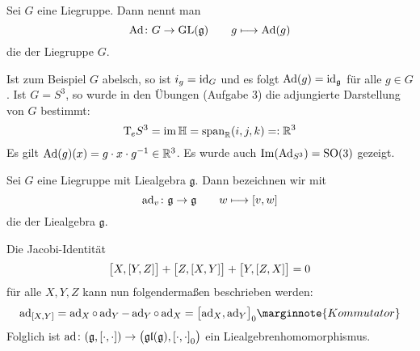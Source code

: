 \begin{definition}[{name=[adjungierte Darstellung der Liegruppe]}]
	Sei $G$ eine Liegruppe.
	Dann nennt man 
	\[
		\Ad \colon G \to \GL(\mathfrak{g}) \qquad g \longmapsto \Ad(g)
	\]
	die  der Liegruppe $G$.
\end{definition}

Ist zum Beispiel $G$ abelsch, so ist $i_g = \id_G$ und es folgt ${\Ad(g)} = \id_{\mathfrak{g}}$ für alle $g \in G$.
Ist $G=S^3$, so wurde in den Übungen (Aufgabe 3) die adjungierte Darstellung von $G$ bestimmt:
\[
	\Tmap_e S^3 = \im \mathbb{H} = \Span_\mathbb{R} (i,j,k) =: \mathbb{R}^3
\]
Es gilt $\Ad(g)(x) = g \cdot x \cdot g^{-1} \in \mathbb{R}^3$.
Es wurde auch $\Im \enbrace*{\Ad_{S^3}} = \SO(3)$ gezeigt.

\begin{definition}[{name=[adjungierte Darstellung der Liealgebra]}]
	Sei $G$ eine Liegruppe mit Liealgebra $\mathfrak{g}$.
	Dann bezeichnen wir mit 
	\[
		\ad_v \colon \mathfrak{g} \to \mathfrak{g} \qquad w \longmapsto \benbrace*{v,w}
	\]
	die  der Liealgebra $\mathfrak{g}$.
\end{definition}

Die Jacobi-Identität 
\[
	\benbrace[\big]{X,\benbrace*{Y,Z}} + \benbrace[\big]{Z, \benbrace*{X,Y}} + \benbrace[\big]{Y, \benbrace*{Z,X}} =0
\]
für alle $X,Y,Z$ kann nun folgendermaßen beschrieben werden:
\[
	\ad_{\benbrace*{X,Y}} = \ad_X \circ \ad_Y - \ad_Y \circ \ad_X = \benbrace[\big]{\ad_X, \ad_Y}_0 \marginnote{Kommutator}
\]
Folglich ist $\ad \colon \enbrace*{\mathfrak{g}, \benbrace*{\cdot ,\cdot }} \to \enbrace[\big]{\mathfrak{gl}(\mathfrak{g}), \benbrace*{\cdot ,\cdot }_0}$
ein Liealgebrenhomomorphismus.

